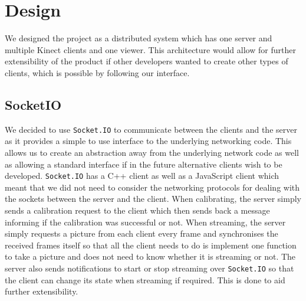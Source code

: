 \documentclass{article}
\begin{document}
\section{Design}
We designed the project as a distributed system which has one server and multiple Kinect clients and one viewer. This architecture would allow for further extensibility of the product if other developers wanted to create other types of clients, which is possible by following our interface.
%


\subsection{SocketIO}
We decided to use \texttt{Socket.IO} \cite{socketio} to communicate between the clients and the server as it provides a simple to use interface to the underlying networking code. This allows us to create an abstraction away from the underlying network code as well as allowing a standard interface if in the future alternative clients wish to be developed. \texttt{Socket.IO} \cite{socketio} has a C++ client as well as a JavaScript client which meant that we did not need to consider the networking protocols for dealing with the sockets between the server and the client. When calibrating, the server simply sends a calibration request to the client which then sends back a message informing if the calibration was successful or not. When streaming, the server simply requests a picture from each client every frame and synchronises the received frames itself so that all the client needs to do is implement one function to take a picture and does not need to know whether it is streaming or not. The server also sends notifications to start or stop streaming over \texttt{Socket.IO} \cite{socketio} so that the client can change its state when streaming if required. This is done to aid further extensibility.
\end{document}
